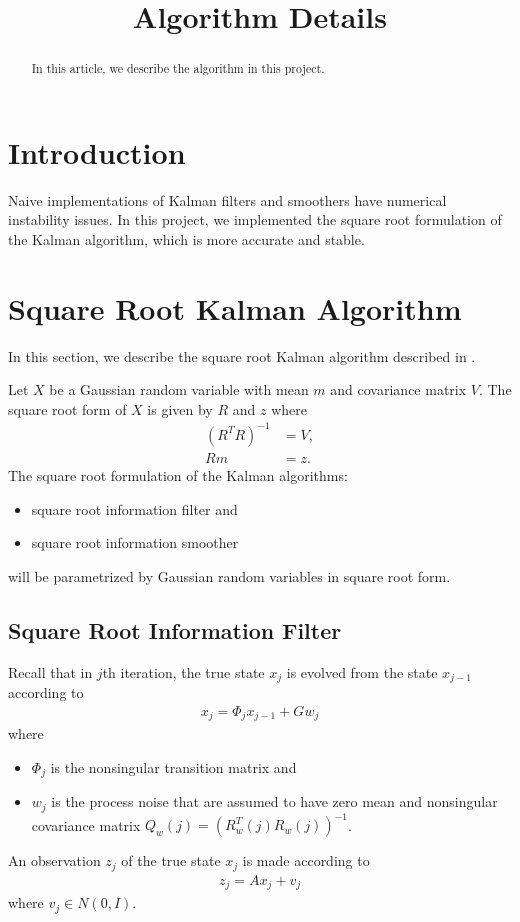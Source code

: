 \documentclass[microtype]{gtpart}     %
\title{Algorithm Details}
\author{}
\theoremstyle{definition}
\begin{document}
\begin{abstract}    %

In this article, we describe the algorithm in this project.

\end{abstract}

\maketitle


\section{Introduction}

Naive implementations of Kalman filters and smoothers have numerical instability issues.
In this project, we implemented the square root formulation of the Kalman algorithm, which is more accurate and stable. 

\section{Square Root Kalman Algorithm}

In this section, we describe the square root Kalman algorithm described in \cite{bierman2006factorization}.

Let $X$ be a Gaussian random variable with mean $m$ and covariance matrix $V$.
The square root form of $X$ is given by $R$ and $z$ where
\begin{align*}
 (R^TR)^{-1} &= V, \\
 Rm &= z.
\end{align*}
The square root formulation of the Kalman algorithms:
\begin{itemize}
	\item square root information filter and
	\item square root information smoother
\end{itemize}
will be parametrized by Gaussian random variables in square root form.

\subsection{Square Root Information Filter}

Recall that in $j$th iteration, the true state $x_j$ is evolved from the state $x_{j-1}$ according to
\begin{align}
	x_j = \Phi_j x_{j-1} + Gw_j \label{eq:predict}
\end{align}
where
\begin{itemize}
	\item $\Phi_j$ is the nonsingular transition matrix and
	\item $w_j$ is the process noise that are assumed to have zero mean and nonsingular covariance matrix 
	$Q_w(j)=(R^T_w(j)R_w(j))^{-1}$.
\end{itemize}
An observation $z_j$ of the true state $x_j$ is made according to
\begin{align*}
	z_j = A x_j + v_j
\end{align*}
where $v_j \in N(0, I)$.
\end{document}
